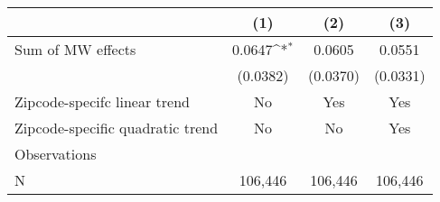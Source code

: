 {
\def\sym#1{\ifmmode^{#1}\else\(^{#1}\)\fi}
\begin{tabular}{l*{3}{c}}
\hline\hline
          &\multicolumn{1}{c}{(1)}         &\multicolumn{1}{c}{(2)}         &\multicolumn{1}{c}{(3)}         \\
\hline
Sum of MW effects&   0.0647\sym{*}  &   0.0605         &   0.0551         \\
          & (0.0382)         & (0.0370)         & (0.0331)         \\
\hline
Zipcode-specifc linear trend&       No         &      Yes         &      Yes         \\
Zipcode-specific quadratic trend&       No         &       No         &      Yes         \\
Observations&                  &                  &                  \\
N         &  106,446         &  106,446         &  106,446         \\
\hline\hline
\end{tabular}
}
